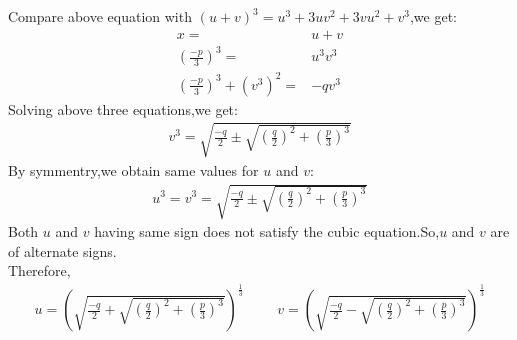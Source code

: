 \documentclass[a4paper,reqno,11pt]{book}
\theoremstyle{plain}%
\theoremstyle{definition}
\begin{document}
Compare above equation with $(u+v)^3=u^3+3uv^2+3vu^2+v^3$,we get:
\begin{align*}
    x=&u+v\\
    \left(\frac{-p}{3}\right)^3=&u^3v^3\\
    \left(\frac{-p}{3}\right)^3+(v^3)^2=&-qv^3
\end{align*}
Solving above three equations,we get:
\begin{eqnarray*}
    v^3=\sqrt{\frac{-q}{2}\pm \sqrt{\left(\frac{q}{2}\right)^2+\left(\frac{p}{3}\right)^3}}   
\end{eqnarray*}
By symmentry,we obtain same values for $u$ and $v$:
\begin{eqnarray*}
    u^3=v^3=\sqrt{\frac{-q}{2}\pm \sqrt{\left(\frac{q}{2}\right)^2+\left(\frac{p}{3}\right)^3}}
\end{eqnarray*}
Both $u$ and $v$ having same sign does not satisfy the cubic equation.So,$u$ and $v$ are of alternate signs.\\
Therefore,
\begin{eqnarray*}
u=\left(\sqrt{\frac{-q}{2}+\sqrt{\left(\frac{q}{2}\right)^2+\left(\frac{p}{3}\right)^3}}\right)^\frac{1}{3}\hspace{1cm}v=\left(\sqrt{\frac{-q}{2}-\sqrt{\left(\frac{q}{2}\right)^2+\left(\frac{p}{3}\right)^3}}\right)^\frac{1}{3}
\end{eqnarray*}
\end{document}
